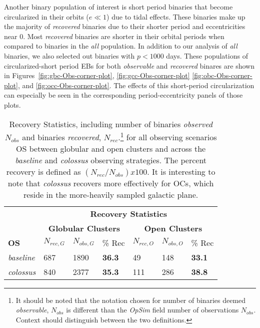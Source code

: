 \documentclass[twocolumn]{aastex63}
\begin{document}
Another binary population of interest is short period binaries that become circularized in their orbits ($e \ll 1$) due to tidal effects. These binaries make up the majority of \textit{recovered} binaries due to their shorter period and eccentricities near 0. 
Most \textit{recovered} binaries are shorter in their orbital periods when compared to binaries in the \textit{all} population. In addition to our analysis of \textit{all} binaries, we also selected out binaries with $\textit{p} < 1000$ days. These populations of circularized-short period EBs for both \textit{observable} and \textit{recovered} binares are shown in Figures~\ref{fig:gbc-Obs-corner-plot}, \ref{fig:gcc-Obs-corner-plot} \ref{fig:obc-Obs-corner-plot}, and \ref{fig:occ-Obs-corner-plot}. The effects of this short-period circularization can especially be seen in the corresponding period-eccentricity panels of those plots.


    

\begin{table}%
    \centering
    \begin{tabular}{lllllll}
    
    & \multicolumn{6}{c}{{\textbf{Recovery Statistics}} }                         \\
    { \textbf{}}         & \multicolumn{3}{c}{{ \textbf{Globular Clusters}}} & \multicolumn{3}{c}{\textbf{Open Clusters}} \\
    \textbf{OS} &  $N_{rec,G}$ & $N_{obs,G}$ & \% Rec & $N_{rec,O}$ &  $N_{obs,O}$ & \% Rec \\
    \hline
    \textit{baseline} & 687 & 1890  & \textbf{36.3} &  49 & 148 & \textbf{33.1} \\
    \textit{colossus} & 840 & 2377 & \textbf{35.3} & 111 & 286 & \textbf{38.8} 
    \end{tabular}
    \caption{Recovery Statistics, including number of binaries \textit{observed} $N_{obs}$ and binaries \textit{recovered}, $N_{rec}$.\footnote{It should be noted that the notation chosen for number of binaries deemed \textit{observable}, $N_{obs}$ is different than the \textit{OpSim} field number of observations $N_{obs}$. Context should distinguish between the two definitions.} for all observing scenarios OS between globular and open clusters and across the \textit{baseline} and \textit{colossus} observing strategies. The percent recovery is defined as $(N_{rec}/N_{obs}) x 100$. It is interesting to note that \textit{colossus} recovers more effectively for OCs, which reside in the more-heavily sampled galactic plane.}
    \label{tab:recovery_table}

\end{table}
\end{document}
